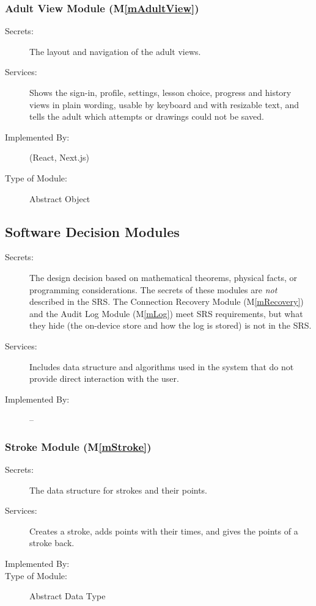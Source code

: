 \documentclass[12pt, titlepage]{article}
\newcommand{\mref}[1]{M\ref{#1}}
\begin{document}
\subsubsection{Adult View Module (\mref{mAdultView})}

\begin{description}
\item[Secrets:] The layout and navigation of the adult views.
\item[Services:] Shows the sign-in, profile, settings, lesson choice, progress
  and history views in plain wording, usable by keyboard and with resizable
  text, and tells the adult which attempts or drawings could not be saved.
\item[Implemented By:] \progname{} (React, Next.js)
\item[Type of Module:] Abstract Object
\end{description}

\subsection{Software Decision Modules}

\begin{description}
\item[Secrets:] The design decision based on mathematical theorems, physical
  facts, or programming considerations. The secrets of these modules are
  \emph{not} described in the SRS. The Connection Recovery Module
  (\mref{mRecovery}) and the Audit Log Module (\mref{mLog}) meet SRS
  requirements, but what they hide (the on-device store and how the log is
  stored) is not in the SRS.
\item[Services:] Includes data structure and algorithms used in the system that
  do not provide direct interaction with the user.
\item[Implemented By:] --
\end{description}

\subsubsection{Stroke Module (\mref{mStroke})}

\begin{description}
\item[Secrets:] The data structure for strokes and their points.
\item[Services:] Creates a stroke, adds points with their times, and gives the
  points of a stroke back.
\item[Implemented By:] \progname{}
\item[Type of Module:] Abstract Data Type
\end{description}
\end{document}
